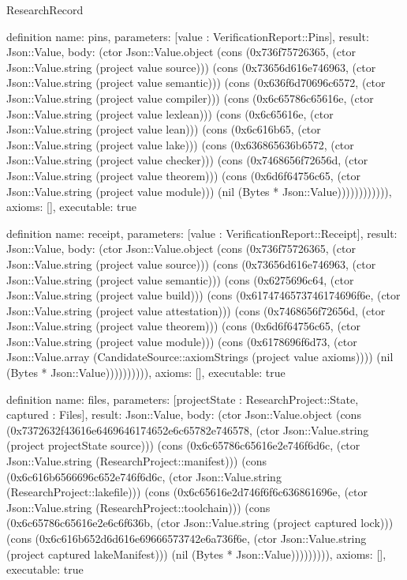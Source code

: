 \begin{lexlean}{ResearchRecord}
\begin{semanticmodule}
definition{
 name: pins,
 parameters: [value : VerificationReport::Pins],
 result: Json::Value,
 body: (ctor Json::Value.object (cons (0x736f75726365, (ctor Json::Value.string (project value source))) (cons (0x73656d616e746963, (ctor Json::Value.string (project value semantic))) (cons (0x636f6d70696c6572, (ctor Json::Value.string (project value compiler))) (cons (0x6c65786c65616e, (ctor Json::Value.string (project value lexlean))) (cons (0x6c65616e, (ctor Json::Value.string (project value lean))) (cons (0x6c616b65, (ctor Json::Value.string (project value lake))) (cons (0x636865636b6572, (ctor Json::Value.string (project value checker))) (cons (0x7468656f72656d, (ctor Json::Value.string (project value theorem))) (cons (0x6d6f64756c65, (ctor Json::Value.string (project value module))) (nil (Bytes * Json::Value)))))))))))),
 axioms: [],
 executable: true
}

definition{
 name: receipt,
 parameters: [value : VerificationReport::Receipt],
 result: Json::Value,
 body: (ctor Json::Value.object (cons (0x736f75726365, (ctor Json::Value.string (project value source))) (cons (0x73656d616e746963, (ctor Json::Value.string (project value semantic))) (cons (0x6275696c64, (ctor Json::Value.string (project value build))) (cons (0x6174746573746174696f6e, (ctor Json::Value.string (project value attestation))) (cons (0x7468656f72656d, (ctor Json::Value.string (project value theorem))) (cons (0x6d6f64756c65, (ctor Json::Value.string (project value module))) (cons (0x6178696f6d73, (ctor Json::Value.array (CandidateSource::axiomStrings (project value axioms)))) (nil (Bytes * Json::Value)))))))))),
 axioms: [],
 executable: true
}

definition{
 name: files,
 parameters: [projectState : ResearchProject::State, captured : Files],
 result: Json::Value,
 body: (ctor Json::Value.object (cons (0x7372632f43616e6469646174652e6c65782e746578, (ctor Json::Value.string (project projectState source))) (cons (0x6c65786c65616e2e746f6d6c, (ctor Json::Value.string (ResearchProject::manifest))) (cons (0x6c616b6566696c652e746f6d6c, (ctor Json::Value.string (ResearchProject::lakefile))) (cons (0x6c65616e2d746f6f6c636861696e, (ctor Json::Value.string (ResearchProject::toolchain))) (cons (0x6c65786c65616e2e6c6f636b, (ctor Json::Value.string (project captured lock))) (cons (0x6c616b652d6d616e69666573742e6a736f6e, (ctor Json::Value.string (project captured lakeManifest))) (nil (Bytes * Json::Value))))))))),
 axioms: [],
 executable: true
}


\end{semanticmodule}
\end{lexlean}
